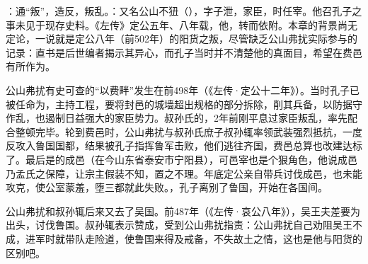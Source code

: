 {
\item {}：通“叛”，造反，叛乱。：又名公山不狃（），字子泄，家臣，时任宰。他召孔子之事未见于现存史料。《左传》定公五年、八年载，他，转而依附。本章的背景尚无定论，一说就是定公八年（前502年）的阳货之叛，尽管缺乏公山弗扰实际参与的记录：直书是后世编者揭示其异心，而孔子当时并不清楚他的真面目，希望在费邑有所作为。%

公山弗扰有史可查的“以费畔”发生在前498年（《左传·定公十二年》）。当时孔子已被任命为，主持工程，要将封邑的城墙超出规格的部分拆除，削其兵备，以防据守作乱，也遏制日益强大的家臣势力。叔孙氏的，2年前刚平息过家臣叛乱，率先配合整顿完毕。轮到费邑时，公山弗扰与叔孙氏庶子叔孙辄率领武装强烈抵抗，一度反攻入鲁国国都，结果被孔子指挥鲁军击败，他们逃往齐国，费邑总算也改建达标了。最后是的成邑（在今山东省泰安市宁阳县），可邑宰也是个狠角色，他说成邑乃孟氏之保障，让宗主假装不知，置之不理。年底定公亲自带兵讨伐成邑，也未能攻克，使公室蒙羞，堕三都就此失败。，孔子离别了鲁国，开始在各国间。

公山弗扰和叔孙辄后来又去了吴国。前487年（《左传·哀公八年》），吴王夫差要为出头，讨伐鲁国。叔孙辄表示赞成，受到公山弗扰指责：公山弗扰自己劝阻吴王不成，进军时就带队走险道，使鲁国来得及戒备，不失故土之情，这也是他与阳货的区别吧。

}
